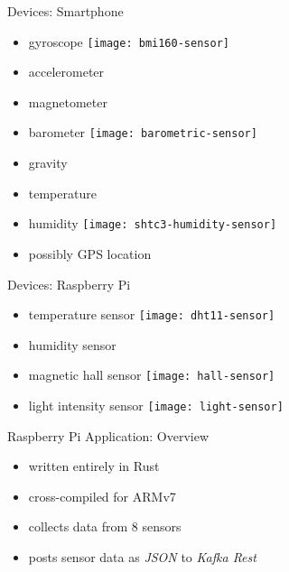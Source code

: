 \documentclass[aspectratio=1610]{beamer}
\begin{document}
  \begin{frame}{Devices: Smartphone}
    \begin{itemize}
      \item gyroscope
            \hspace*{2em}
            \texttt{[image: bmi160-sensor]}
      \item accelerometer
      \item magnetometer
      \item barometer
            \hspace*{2em}
            \texttt{[image: barometric-sensor]}
      \item gravity
      \item temperature
      \item humidity
            \hspace*{2em}
            \texttt{[image: shtc3-humidity-sensor]}
      \item possibly GPS location
    \end{itemize}
  \end{frame}

  \begin{frame}{Devices: Raspberry Pi}
    \begin{itemize}
      \item temperature sensor
            \hspace*{2em}
            \texttt{[image: dht11-sensor]}
      \item humidity sensor
      \item magnetic hall sensor
            \hspace*{2em}
            \texttt{[image: hall-sensor]}
      \item light intensity sensor
            \hspace*{2em}
            \texttt{[image: light-sensor]}
    \end{itemize}
  \end{frame}

  \begin{frame}{Raspberry Pi Application: Overview}
    \begin{itemize}
      \item written entirely in Rust
      \item cross-compiled for ARMv7
      \item collects data from 8 sensors
      \item posts sensor data as \textit{JSON} to \textit{Kafka Rest}
    \end{itemize}
  \end{frame}
\end{document}
